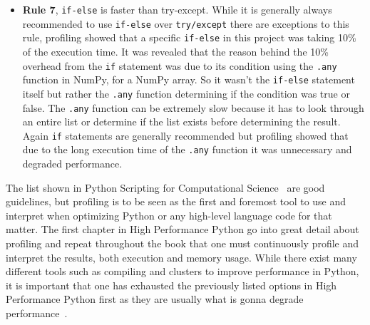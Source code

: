 \documentclass[12pt, a4paper]{article}
\begin{document}
\begin{itemize}


    \item \textbf{Rule 7}, \texttt{if-else} is faster than try-except.
    While it is generally always recommended to use \texttt{if-else} over \texttt{try/except} there are exceptions to this rule, profiling showed that a specific \texttt{if-else} in this project was taking 10\% of the execution time.
    It was revealed that the reason behind the 10\% overhead from the \texttt{if} statement was due to its condition using the \texttt{.any} function in NumPy, for a NumPy array.
    So it wasn't the \texttt{if-else} statement itself but rather the \texttt{.any} function determining if the condition was true or false.
    The \texttt{.any} function can be extremely slow because it has to look through an entire list or determine if the list exists before determining the result.
    Again \texttt{if} statements are generally recommended but profiling showed that due to the long execution time of the \texttt{.any} function it was unnecessary and degraded performance.


\end{itemize}

The list shown in Python Scripting for Computational Science~\cite{pythonBook} are good guidelines, but profiling is to be seen as the first and foremost tool to use and interpret when optimizing Python or any high-level language code for that matter.
The first chapter in High Performance Python go into great detail about profiling and repeat throughout the book that one must continuously profile and interpret the results, both execution and memory usage.
While there exist many different tools such as compiling and clusters to improve performance in Python, it is important that one has exhausted the previously listed options in High Performance Python first as they are usually what is gonna degrade performance~\cite{oreillyCh10}.
\end{document}
